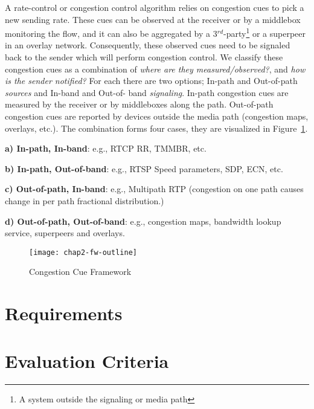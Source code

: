 A rate-control or congestion control algorithm relies on congestion cues to
pick a new sending rate. These cues can be observed at the receiver or by a
middlebox monitoring the flow, and it can also be aggregated by a
3$^{rd}$-party\footnote{A system outside the signaling or media path} or a
superpeer in an overlay network. Consequently, these observed cues need to be
signaled back to the sender which will perform congestion control. We classify
these congestion cues as a combination of \emph{where are they
measured/observed?}, and \emph{how is the sender notified?} For each there are
two options; In-path and Out-of-path \emph{sources} and In-band and Out-of-%
band \emph{signaling}. In-path congestion cues are measured by the receiver or
by middleboxes along the path. Out-of-path congestion cues are reported by
devices outside the media path (congestion maps, overlays, etc.). The
combination forms four cases, they are visualized in Figure~\ref{fig:4:fw}.

\textbf{a) In-path, In-band}: e.g., RTCP RR, TMMBR, etc.

\textbf{b) In-path, Out-of-band}: e.g., RTSP Speed parameters, SDP, ECN, etc.

\textbf{c) Out-of-path, In-band}: e.g., Multipath RTP (congestion on one path
causes change in per path fractional distribution.)

\textbf{d) Out-of-path, Out-of-band}: e.g., congestion maps, bandwidth lookup
service, superpeers and overlays.


\begin{figure}[!h]
\texttt{[image: chap2-fw-outline]}
\caption{Congestion Cue Framework}
\label{fig:4:fw}
\end{figure}



\section{Requirements}
\label{fw.cc.req}

\section{Evaluation Criteria}
\label{fw.cc.eval}

